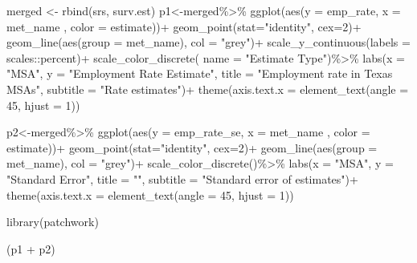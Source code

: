 \documentclass[
  letterpaper,
  DIV=11,
  numbers=noendperiod]{scrreprt}
\newenvironment{Shaded}{\begin{snugshade}}{\end{snugshade}}
\newcommand{\AttributeTok}[1]{\textcolor[rgb]{0.40,0.45,0.13}{#1}}
\newcommand{\DecValTok}[1]{\textcolor[rgb]{0.68,0.00,0.00}{#1}}
\newcommand{\FunctionTok}[1]{\textcolor[rgb]{0.28,0.35,0.67}{#1}}
\newcommand{\NormalTok}[1]{\textcolor[rgb]{0.00,0.23,0.31}{#1}}
\newcommand{\OtherTok}[1]{\textcolor[rgb]{0.00,0.23,0.31}{#1}}
\newcommand{\SpecialCharTok}[1]{\textcolor[rgb]{0.37,0.37,0.37}{#1}}
\newcommand{\StringTok}[1]{\textcolor[rgb]{0.13,0.47,0.30}{#1}}
\begin{document}
\begin{Shaded}
\begin{Highlighting}[]
\NormalTok{merged }\OtherTok{\textless{}{-}} \FunctionTok{rbind}\NormalTok{(srs, surv.est)}
\NormalTok{p1}\OtherTok{\textless{}{-}}\NormalTok{merged}\SpecialCharTok{\%\textgreater{}\%}
  \FunctionTok{ggplot}\NormalTok{(}\FunctionTok{aes}\NormalTok{(}\AttributeTok{y =}\NormalTok{ emp\_rate, }\AttributeTok{x =}\NormalTok{ met\_name , }\AttributeTok{color =}\NormalTok{ estimate))}\SpecialCharTok{+}
  \FunctionTok{geom\_point}\NormalTok{(}\AttributeTok{stat=}\StringTok{"identity"}\NormalTok{,}
             \AttributeTok{cex=}\DecValTok{2}\NormalTok{)}\SpecialCharTok{+}
  \FunctionTok{geom\_line}\NormalTok{(}\FunctionTok{aes}\NormalTok{(}\AttributeTok{group =}\NormalTok{ met\_name),}
            \AttributeTok{col =} \StringTok{"grey"}\NormalTok{)}\SpecialCharTok{+}
  \FunctionTok{scale\_y\_continuous}\NormalTok{(}\AttributeTok{labels =}\NormalTok{ scales}\SpecialCharTok{::}\NormalTok{percent)}\SpecialCharTok{+}
  \FunctionTok{scale\_color\_discrete}\NormalTok{( }\AttributeTok{name =} \StringTok{"Estimate Type"}\NormalTok{)}\SpecialCharTok{\%\textgreater{}\%}
  \FunctionTok{labs}\NormalTok{(}\AttributeTok{x =} \StringTok{"MSA"}\NormalTok{, }
       \AttributeTok{y =} \StringTok{"Employment Rate Estimate"}\NormalTok{,}
       \AttributeTok{title =} \StringTok{"Employment rate in Texas MSAs"}\NormalTok{,}
       \AttributeTok{subtitle =} \StringTok{"Rate estimates"}\NormalTok{)}\SpecialCharTok{+}
  \FunctionTok{theme}\NormalTok{(}\AttributeTok{axis.text.x =} \FunctionTok{element\_text}\NormalTok{(}\AttributeTok{angle =} \DecValTok{45}\NormalTok{, }\AttributeTok{hjust =} \DecValTok{1}\NormalTok{))}

\NormalTok{p2}\OtherTok{\textless{}{-}}\NormalTok{merged}\SpecialCharTok{\%\textgreater{}\%}
  \FunctionTok{ggplot}\NormalTok{(}\FunctionTok{aes}\NormalTok{(}\AttributeTok{y =}\NormalTok{ emp\_rate\_se, }\AttributeTok{x =}\NormalTok{ met\_name , }\AttributeTok{color =}\NormalTok{ estimate))}\SpecialCharTok{+}
  \FunctionTok{geom\_point}\NormalTok{(}\AttributeTok{stat=}\StringTok{"identity"}\NormalTok{,}
             \AttributeTok{cex=}\DecValTok{2}\NormalTok{)}\SpecialCharTok{+}
  \FunctionTok{geom\_line}\NormalTok{(}\FunctionTok{aes}\NormalTok{(}\AttributeTok{group =}\NormalTok{ met\_name),}
            \AttributeTok{col =} \StringTok{"grey"}\NormalTok{)}\SpecialCharTok{+}
  \FunctionTok{scale\_color\_discrete}\NormalTok{()}\SpecialCharTok{\%\textgreater{}\%}
  \FunctionTok{labs}\NormalTok{(}\AttributeTok{x =} \StringTok{"MSA"}\NormalTok{, }
       \AttributeTok{y =} \StringTok{"Standard Error"}\NormalTok{,}
       \AttributeTok{title =} \StringTok{""}\NormalTok{,}
       \AttributeTok{subtitle =} \StringTok{"Standard error of estimates"}\NormalTok{)}\SpecialCharTok{+}
  \FunctionTok{theme}\NormalTok{(}\AttributeTok{axis.text.x =} \FunctionTok{element\_text}\NormalTok{(}\AttributeTok{angle =} \DecValTok{45}\NormalTok{, }\AttributeTok{hjust =} \DecValTok{1}\NormalTok{))}

\FunctionTok{library}\NormalTok{(patchwork)}

\NormalTok{(p1 }\SpecialCharTok{+}\NormalTok{ p2)}
\end{Highlighting}
\end{Shaded}
\end{document}
